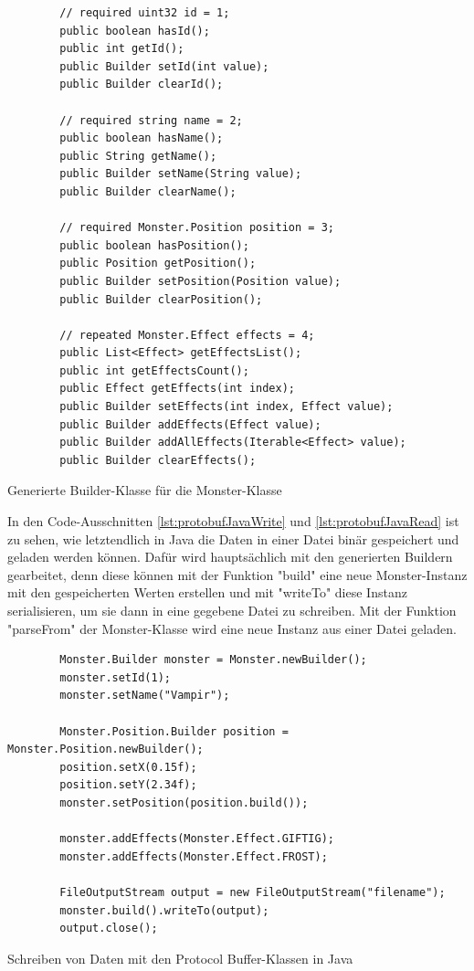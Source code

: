 \begin{listing}[htp]
    \begin{verbatim} 
        // required uint32 id = 1;
        public boolean hasId();
        public int getId();
        public Builder setId(int value);
        public Builder clearId();

        // required string name = 2;
        public boolean hasName();
        public String getName();
        public Builder setName(String value);
        public Builder clearName();

        // required Monster.Position position = 3;
        public boolean hasPosition();
        public Position getPosition();
        public Builder setPosition(Position value);
        public Builder clearPosition();

        // repeated Monster.Effect effects = 4;
        public List<Effect> getEffectsList();
        public int getEffectsCount();
        public Effect getEffects(int index);
        public Builder setEffects(int index, Effect value);
        public Builder addEffects(Effect value);
        public Builder addAllEffects(Iterable<Effect> value);
        public Builder clearEffects();
    \end{verbatim}
    \caption{Generierte Builder-Klasse für die Monster-Klasse}
    \label{lst:protoJavaGeneratedBuilder}
\end{listing}

In den Code-Ausschnitten \ref{lst:protobufJavaWrite} und \ref{lst:protobufJavaRead} ist zu sehen, wie letztendlich in Java die Daten in einer Datei binär gespeichert und geladen werden können. Dafür wird hauptsächlich mit den generierten Buildern gearbeitet, denn diese können mit der Funktion "build" eine neue Monster-Instanz mit den gespeicherten Werten erstellen und mit "writeTo" diese Instanz serialisieren, um sie dann in eine gegebene Datei zu schreiben. Mit der Funktion "parseFrom" der Monster-Klasse wird eine neue Instanz aus einer Datei geladen. 

\begin{listing}[htp]
    \begin{verbatim} 
        Monster.Builder monster = Monster.newBuilder();
        monster.setId(1);
        monster.setName("Vampir");

        Monster.Position.Builder position = Monster.Position.newBuilder();
        position.setX(0.15f);
        position.setY(2.34f);
        monster.setPosition(position.build());

        monster.addEffects(Monster.Effect.GIFTIG);
        monster.addEffects(Monster.Effect.FROST);

        FileOutputStream output = new FileOutputStream("filename");
        monster.build().writeTo(output);
        output.close();
    \end{verbatim}
    \caption{Schreiben von Daten mit den Protocol Buffer-Klassen in Java}
    \label{lst:protobufJavaWrite}
\end{listing}

